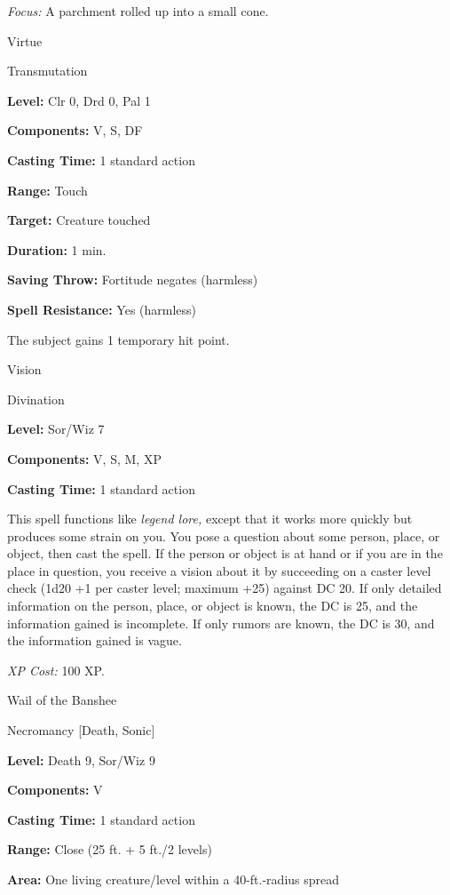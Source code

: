 \documentclass{article}
\begin{document}
\textit{Focus: }A parchment rolled up into a small cone.

\vspace{12pt}
Virtue

Transmutation

\textbf{Level:} Clr 0, Drd 0, Pal 1

\textbf{Components:} V, S, DF

\textbf{Casting Time:} 1 standard action

\textbf{Range:} Touch

\textbf{Target:} Creature touched

\textbf{Duration:} 1 min.

\textbf{Saving Throw:} Fortitude negates (harmless)

\textbf{Spell Resistance:} Yes (harmless)

The subject gains 1 temporary hit point.

\vspace{12pt}
Vision

Divination

\textbf{Level:} Sor/Wiz 7

\textbf{Components:} V, S, M, XP

\textbf{Casting Time:} 1 standard action

This spell functions like \textit{legend lore, }except that it works more quickly 
but produces some strain on you. You pose a question about some person, place, 
or object, then cast the spell. If the person or object is at hand or if you are 
in the place in question, you receive a vision about it by succeeding on a caster 
level check (1d20 +1 per caster level; maximum +25) against DC 20. If only detailed 
information on the person, place, or object is known, the DC is 25, and the information 
gained is incomplete. If only rumors are known, the DC is 30, and the information 
gained is vague.

\textit{XP Cost: }100 XP.

\vspace{12pt}
Wail of the Banshee

Necromancy [Death, Sonic]

\textbf{Level:} Death 9, Sor/Wiz 9

\textbf{Components:} V

\textbf{Casting Time:} 1 standard action

\textbf{Range:} Close (25 ft. + 5 ft./2 levels)

\textbf{Area:} One living creature/level within a 40-ft.-radius spread
\end{document}
